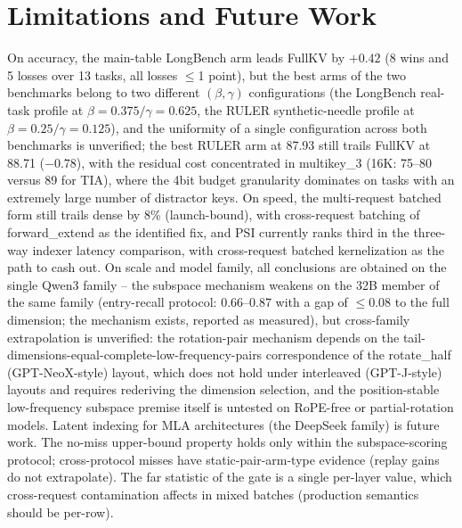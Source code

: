\documentclass[11pt]{article}
\begin{document}
\section{Limitations and Future Work}

On accuracy, the main-table LongBench arm leads FullKV by $+0.42$ (8 wins and 5 losses over 13 tasks, all losses $\leq$1 point), but the best arms of the two benchmarks belong to two different $(\beta,\gamma)$ configurations (the LongBench real-task profile at $\beta{=}0.375/\gamma{=}0.625$, the RULER synthetic-needle profile at $\beta{=}0.25/\gamma{=}0.125$), and the uniformity of a single configuration across both benchmarks is unverified; the best RULER arm at 87.93 still trails FullKV at 88.71 ($-0.78$), with the residual cost concentrated in multikey\_3 (16K: 75--80 versus 89 for TIA), where the 4bit budget granularity dominates on tasks with an extremely large number of distractor keys. On speed, the multi-request batched form still trails dense by 8\% (launch-bound), with cross-request batching of forward\_extend as the identified fix, and PSI currently ranks third in the three-way indexer latency comparison, with cross-request batched kernelization as the path to cash out. On scale and model family, all conclusions are obtained on the single Qwen3 family -- the subspace mechanism weakens on the 32B member of the same family (entry-recall protocol: 0.66--0.87 with a gap of $\le$0.08 to the full dimension; the mechanism exists, reported as measured), but cross-family extrapolation is unverified: the rotation-pair mechanism depends on the tail-dimensions-equal-complete-low-frequency-pairs correspondence of the rotate\_half (GPT-NeoX-style) layout, which does not hold under interleaved (GPT-J-style) layouts and requires rederiving the dimension selection, and the position-stable low-frequency subspace premise itself is untested on RoPE-free or partial-rotation models. Latent indexing for MLA architectures (the DeepSeek family) is future work. The no-miss upper-bound property holds only within the subspace-scoring protocol; cross-protocol misses have static-pair-arm-type evidence (replay gains do not extrapolate). The far statistic of the gate is a single per-layer value, which cross-request contamination affects in mixed batches (production semantics should be per-row).

\end{document}

